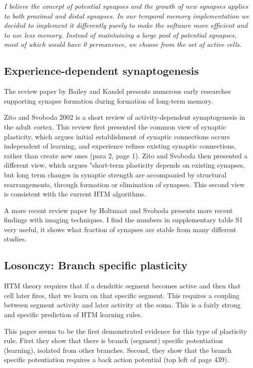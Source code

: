 \documentclass{article} %
\begin{document}
\emph{I believe the concept of potential synapses and the growth of new synapses
applies to both proximal and distal synapses.  In our temporal memory
implementation we decided to implement it differently purely to make the
software more efficient and to use less memory.  Instead of maintaining a large
pool of potential synapses, most of which would have 0 permanence, we choose
from the set of active cells.}

\subsection{Experience-dependent synaptogenesis}

The review paper by Bailey and Kandel \cite{Bailey1993} presents numerous early
researches supporting synapse formation during formation of long-term memory.

Zito and Svoboda 2002 \cite{Zito2002} is a short review of activity-dependent
synaptogenesis in the adult cortex. This review first presented the common view
of synaptic plasticity, which argues initial establishment of synaptic
connections occurs independent of learning, and experience refines existing
synaptic connections, rather than create new ones (para 2, page 1). Zito and
Svoboda then presented a different view, which argues "short-term plasticity
depends on existing synapses, but long term changes in synaptic strength are
accompanied by structural rearrangements, through formation or elimination of
synapses. This second view is consistent with the current HTM algorithms.

A more recent review paper by Holtmaat and Svoboda \cite{Holtmaat2009} presents
more recent findings with imaging techniques. I find the numbers in
supplementary table S1 very useful, it shows what fraction of synapses are
stable from many different studies.

\subsection{Losonczy: Branch specific plasticity}

HTM theory requires that if a dendritic segment becomes active and then that
cell later fires, that we learn on that specific segment. This requires a
coupling between segment activity and later activity at the soma. This is a
fairly strong and specific prediction of HTM learning rules.

This paper\cite{Losonczy2008} seems to be the first demonstrated evidence for
this type of plasticity rule. First they show that there is branch (segment)
specific potentiation (learning), isolated from other branches. Second, they
show that the branch specific potentiation requires a back action potential
(top left of page 439).
\end{document}
